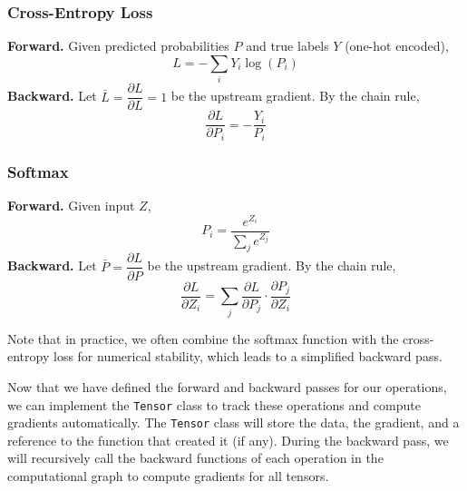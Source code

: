 \documentclass{article}
\begin{document}
\subsubsection{Cross-Entropy Loss}
\textbf{Forward.} Given predicted probabilities $P$ and true labels $Y$ (one-hot encoded),
\[
    L = -\sum_{i} Y_i \log(P_i)
\]
\textbf{Backward.} Let $\bar{L} = \dfrac{\partial L}{\partial L} = 1$ be the upstream gradient. By the chain rule,
\[
    \frac{\partial L}{\partial P_i} = -\frac{Y_i}{P_i}
\]

\subsubsection{Softmax}
\textbf{Forward.} Given input $Z$,
\[
    P_i = \frac{e^{Z_i}}{\sum_j e^{Z_j}}
\]
\textbf{Backward.} Let $\bar{P} = \dfrac{\partial L}{\partial P}$ be the upstream gradient. By the chain rule,
\[
    \frac{\partial L}{\partial Z_i} = \sum_j \frac{\partial L}{\partial P_j} \cdot \frac{\partial P_j}{\partial Z_i}
\]

Note that in practice, we often combine the softmax function with the cross-entropy loss for numerical stability, which leads to a simplified backward pass.

Now that we have defined the forward and backward passes for our operations, we can implement the \texttt{Tensor} class to track these operations and compute gradients automatically. The \texttt{Tensor} class will store the data, the gradient, and a reference to the function that created it (if any). During the backward pass, we will recursively call the backward functions of each operation in the computational graph to compute gradients for all tensors.


\end{document}
